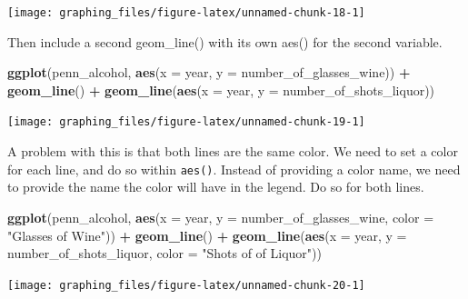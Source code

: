 \documentclass[
  12pt,
]{book}
\newenvironment{Shaded}{\begin{snugshade}}{\end{snugshade}}
\newcommand{\DataTypeTok}[1]{\textcolor[rgb]{0.13,0.29,0.53}{#1}}
\newcommand{\KeywordTok}[1]{\textcolor[rgb]{0.13,0.29,0.53}{\textbf{#1}}}
\newcommand{\NormalTok}[1]{#1}
\newcommand{\OperatorTok}[1]{\textcolor[rgb]{0.81,0.36,0.00}{\textbf{#1}}}
\newcommand{\StringTok}[1]{\textcolor[rgb]{0.31,0.60,0.02}{#1}}
\begin{document}
\begin{center}\texttt{[image: graphing\_files/figure-latex/unnamed-chunk-18-1]} \end{center}

Then include a second geom\_line() with its own aes() for the second variable.

\begin{Shaded}
\begin{Highlighting}[]
\KeywordTok{ggplot}\NormalTok{(penn\_alcohol, }\KeywordTok{aes}\NormalTok{(}\DataTypeTok{x =}\NormalTok{ year, }\DataTypeTok{y =}\NormalTok{ number\_of\_glasses\_wine)) }\OperatorTok{+}
\StringTok{  }\KeywordTok{geom\_line}\NormalTok{() }\OperatorTok{+}
\StringTok{  }\KeywordTok{geom\_line}\NormalTok{(}\KeywordTok{aes}\NormalTok{(}\DataTypeTok{x =}\NormalTok{ year, }\DataTypeTok{y =}\NormalTok{ number\_of\_shots\_liquor))}
\end{Highlighting}
\end{Shaded}

\begin{center}\texttt{[image: graphing\_files/figure-latex/unnamed-chunk-19-1]} \end{center}

A problem with this is that both lines are the same color. We need to set a color for each line, and do so within \texttt{aes()}. Instead of providing a color name, we need to provide the name the color will have in the legend. Do so for both lines.

\begin{Shaded}
\begin{Highlighting}[]
\KeywordTok{ggplot}\NormalTok{(penn\_alcohol, }\KeywordTok{aes}\NormalTok{(}\DataTypeTok{x =}\NormalTok{ year, }\DataTypeTok{y =}\NormalTok{ number\_of\_glasses\_wine,}
                         \DataTypeTok{color =} \StringTok{"Glasses of Wine"}\NormalTok{)) }\OperatorTok{+}
\StringTok{  }\KeywordTok{geom\_line}\NormalTok{() }\OperatorTok{+}
\StringTok{  }\KeywordTok{geom\_line}\NormalTok{(}\KeywordTok{aes}\NormalTok{(}\DataTypeTok{x =}\NormalTok{ year, }\DataTypeTok{y =}\NormalTok{ number\_of\_shots\_liquor,}
                \DataTypeTok{color =} \StringTok{"Shots of of Liquor"}\NormalTok{))}
\end{Highlighting}
\end{Shaded}

\begin{center}\texttt{[image: graphing\_files/figure-latex/unnamed-chunk-20-1]} \end{center}
\end{document}
